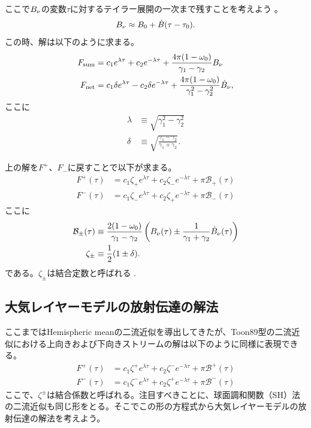 ここで$B_\nu$の変数$\tau$に対するテイラー展開の一次まで残すことを考えよう\cite{1989JGR....9416287T} \cite{heng2017exoplanetary}。
\begin{align}
B_\nu \approx B_0 + \dot{B} (\tau - \tau_0).
\end{align}
この時、解は以下のように求まる。
\begin{align}
F_\mathrm{sum} &= c_1 e^{\lambda \tau} + c_2 e^{-\lambda \tau} +\frac{ 4 \pi (1-\omega_0)}{\gamma_1 - \gamma_2} B_\nu \\
F_\mathrm{net} &= c_1 \delta e^{\lambda \tau} - c_2 \delta e^{-\lambda \tau} +\frac{ 4 \pi (1-\omega_0)}{\gamma_1^2 - \gamma_2^2} \dot{B}_\nu,
\end{align}
ここに
\begin{align}
\lambda &\equiv\sqrt{\gamma_1^2-\gamma_2^2} \\
\delta &\equiv\sqrt{\frac{\gamma_1 - \gamma_2}{\gamma_1 + \gamma_2}}.
\end{align}

上の解を$F^+$、$F_-$に戻すことで以下が求まる。
\begin{align}
F^+ (\tau) &= c_1 \zeta_+ e^{\lambda \tau} + c_2 \zeta_- e^{-\lambda \tau} + \pi \mathcal{B}_+ (\tau)  \\
F^- (\tau) &= c_1 \zeta_- e^{\lambda \tau} + c_2 \zeta_+ e^{-\lambda \tau} + \pi \mathcal{B}_- (\tau)
\end{align}
ここに
\begin{align}
 \mathcal{B}_\pm(\tau) &\equiv\frac{ 2 (1-\omega_0)}{\gamma_1 - \gamma_2} \left( B_\nu(\tau) \pm \frac{1}{\gamma_1 + \gamma_2} \dot{B}_\nu (\tau) \right) \\
 \zeta_\pm &\equiv\frac{1}{2} (1 \pm \delta).
\end{align}
である。$\zeta_\pm$は結合定数と呼ばれる
 \cite{heng2017exoplanetary}.

\subsection*{大気レイヤーモデルの放射伝達の解法}

ここまではHemispheric meanの二流近似を導出してきたが、Toon89型の二流近似における上向きおよび下向きストリームの解は以下のように同様に表現できる。
\begin{align}
\label{eq:2stream_1}
F^+ (\tau) &= c_1 \zeta^+ e^{\lambda \tau} + c_2 \zeta^- e^{-\lambda \tau} + \pi \mathcal{B}^+ (\tau)  \\
\label{eq:2stream_2}
F^- (\tau) &= c_1 \zeta^- e^{\lambda \tau} + c_2 \zeta^+ e^{-\lambda \tau} + \pi \mathcal{B}^- (\tau)
\end{align}
ここで、$\zeta^\pm$は結合係数と呼ばれる。注目すべきことに、球面調和関数（SH）法の二流近似も同じ形をとる。そこでこの形の方程式から大気レイヤーモデルの放射伝達の解法を考えよう。

